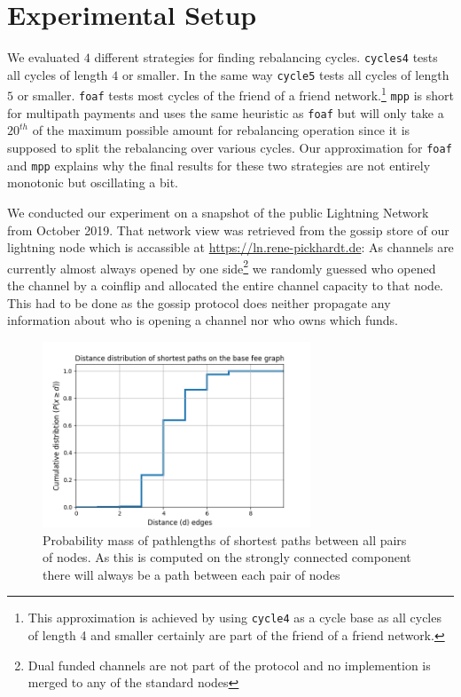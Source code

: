 \documentclass[a4paper]{paper}
\begin{document}
\section{Experimental Setup}
\label{sec:setup}

We evaluated $4$ different strategies for finding rebalancing cycles. \texttt{cycles4} tests all cycles of length $4$ or smaller. In the same way \texttt{cycle5} tests all cycles of length $5$ or smaller. \texttt{foaf} tests most cycles of the friend of a friend network.\footnote{This approximation is achieved by using \texttt{cycle4} as a cycle base as all cycles of length 4 and smaller certainly are part of the friend of a friend network.}
\texttt{mpp} is short for multipath payments and uses the same heuristic as \texttt{foaf} but will only take a $20^{th}$ of the maximum possible amount for rebalancing operation since it is supposed to split the rebalancing over various cycles.
Our approximation for \texttt{foaf} and \texttt{mpp} explains why the final results for these two strategies are not entirely monotonic but oscillating a bit.

We conducted our experiment on a snapshot of the public Lightning Network from October 2019.
That network view was retrieved from the gossip store of our lightning node which is accassible at \url{https://ln.rene-pickhardt.de}:
As channels are currently almost always opened by one side\footnote{Dual funded channels are not part of the protocol and no implemention is merged to any of the standard nodes} we randomly guessed who opened the channel by a coinflip and allocated the entire channel capacity to that node.
This had to be done as the gossip protocol does neither propagate any information about who is opening a channel nor who owns which funds.

\begin{figure}
 \centering
 \includegraphics[width=8cm]{code/vs/fig/cummulative_distance_distribution_lin_scale.png}
 \caption{Probability mass of pathlengths of shortest paths between all pairs of nodes. As this is computed on the strongly connected component there will always be a path between each pair of nodes}
 \label{fig:cumulative_distance}
\end{figure}
\end{document}

